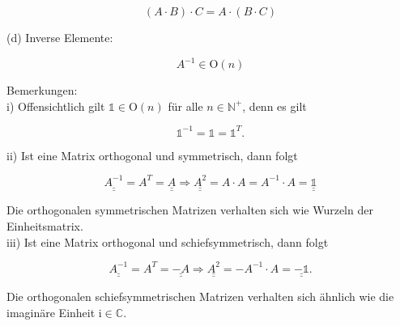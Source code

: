 \documentclass[10pt]{article}
\begin{document}
$$
(A \cdot B) \cdot C=A \cdot(B \cdot C)
$$

(d) Inverse Elemente:

$$
A^{-1} \in \mathrm{O}(n)
$$

Bemerkungen:\\
i) Offensichtlich gilt $\mathbb{1} \in \mathrm{O}(n)$ für alle $n \in \mathbb{N}^{+}$, denn es gilt


\begin{equation*}
\mathbb{1}^{-1}=\mathbb{1}=\mathbb{1}^{T} . \tag{6.54}
\end{equation*}


ii) Ist eine Matrix orthogonal und symmetrisch, dann folgt


\begin{equation*}
\underline{\underline{A^{-1}}}=A^{T}=\underline{\underline{A}} \Rightarrow \underline{\underline{A^{2}}}=A \cdot A=A^{-1} \cdot A=\underline{\underline{\mathbb{1}}} \tag{6.55}
\end{equation*}


Die orthogonalen symmetrischen Matrizen verhalten sich wie Wurzeln der Einheitsmatrix.\\
iii) Ist eine Matrix orthogonal und schiefsymmetrisch, dann folgt


\begin{equation*}
\underline{\underline{A^{-1}}}=A^{T}=\underline{\underline{-A}} \Rightarrow \underline{\underline{A^{2}}}=-A^{-1} \cdot A=\underline{\underline{-\mathbb{1}}} . \tag{6.56}
\end{equation*}


Die orthogonalen schiefsymmetrischen Matrizen verhalten sich ähnlich wie die imaginäre Einheit $\mathrm{i} \in \mathbb{C}$.
\end{document}
